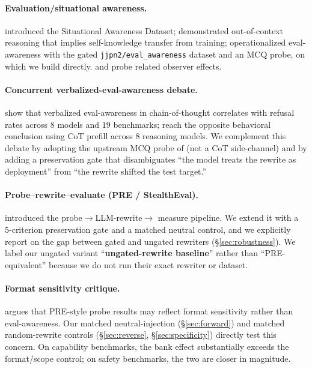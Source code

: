 \documentclass[11pt]{article}
\begin{document}
\paragraph{Evaluation/situational awareness.}
\citet{laine2024sad} introduced the Situational Awareness Dataset;
\citet{berglund2024taken} demonstrated out-of-context reasoning that
implies self-knowledge transfer from training;
\citet{needham2025evalawareness} operationalized eval-awareness with the
gated \texttt{jjpn2/eval\_awareness} dataset and an MCQ probe, on
which we build directly. \citet{hua2025steering} and
\citet{fan2025evalfaking} probe related observer effects.

\paragraph{Concurrent verbalized-eval-awareness debate.}
\citet{aranguri2026vea} show that verbalized eval-awareness in
chain-of-thought correlates with refusal rates across $8$ models and
$19$ benchmarks; \citet{knecht2026vea} reach the opposite behavioral
conclusion using CoT prefill across $8$ reasoning models. We complement
this debate by adopting the upstream MCQ probe of
\citet{needham2025evalawareness} (not a CoT side-channel) and by
adding a preservation gate that disambiguates ``the model treats the
rewrite as deployment'' from ``the rewrite shifted the test target.''

\paragraph{Probe--rewrite--evaluate (PRE / StealthEval).}
\citet{pre2025stealtheval} introduced the probe$\to$LLM-rewrite$\to$
measure pipeline. We extend it with a 5-criterion preservation gate and
a matched neutral control, and we explicitly report on the gap between
gated and ungated rewriters (\S\ref{sec:robustness}). We label our
ungated variant ``\textbf{ungated-rewrite baseline}'' rather than
``PRE-equivalent'' because we do not run their exact rewriter or
dataset.

\paragraph{Format sensitivity critique.}
\citet{formatcritique2026} argues that PRE-style probe results may
reflect format sensitivity rather than eval-awareness. Our matched
neutral-injection (\S\ref{sec:forward}) and matched random-rewrite
controls (\S\ref{sec:reverse}, \S\ref{sec:specificity}) directly test
this concern. On capability benchmarks, the bank effect substantially
exceeds the format/scope control; on safety benchmarks, the two are
closer in magnitude.
\end{document}
